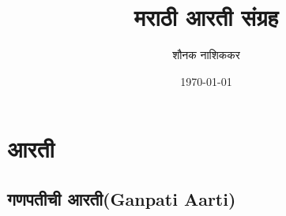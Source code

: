 \documentclass[letterpaper,twocolumn,openany,nodeprecatedcode]{dndbook}
\title{ मराठी आरती संग्रह } \author{ शौनक नाशिककर } \date{\today}
\begin{document}
\frontmatter

\maketitle

\tableofcontents

\mainmatter%

\part{आरती}

\chapter{गणपतीची आरती(Ganpati Aarti)}
\end{document}
